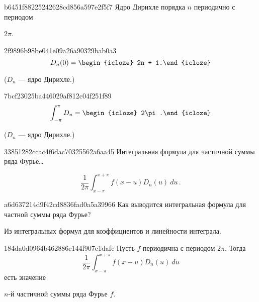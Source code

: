 \begin{note}{b6451f88225242628cd856a597e2f5f7}
    Ядро Дирихле порядка \({ n }\) периодично с периодом \begin{icloze}{1}\({ 2\pi }\).\end{icloze}
\end{note}

\begin{note}{2f9896b98be041e09a26a90329bab0a3}
    \[
        D_n(0) = \begin{icloze}{1}2n + 1.\end{icloze}
    \]

    \begin{center}
        \tiny
        (\({ D_n }\) --- ядро Дирихле.)
    \end{center}
\end{note}

\begin{note}{7bcf23025ba446029af812c04f251f89}
    \[
        \int_{-\pi}^{\pi} D_n = \begin{icloze}{1}2\pi.\end{icloze}
    \]

    \begin{center}
        \tiny
        (\({ D_n }\) --- ядро Дирихле.)
    \end{center}
\end{note}

\begin{note}{33851282ccac4f6dac70325562a6aa45}
    Интегральная формула для частичной суммы ряда Фурье\ldots

    \begin{cloze}{1}
        \[
            \frac{1}{2\pi} \int_{x-\pi}^{x+\pi} f(x-u) D_{n}(u)\: du\,.
        \]
    \end{cloze}
\end{note}

\begin{note}{a6d637214d9f42cd8836fad0a5a39966}
    Как выводится интегральная формула для частной суммы ряда Фурье?

    \begin{cloze}{1}
        Из интегральных формул для коэффициентов и линейности интеграла.
    \end{cloze}
\end{note}

\begin{note}{184da0d0964b462886c144f907c1dafc}
    Пусть \({ f }\) периодична с периодом \({ 2\pi }\).
    Тогда
    \[
        \frac{1}{2\pi} \int_{x - \pi}^{x + \pi} f(x - u) D_n(u)\: du
    \]
    есть значение \begin{icloze}{1}\({ n }\)-й частичной суммы ряда Фурье \({ f }\).\end{icloze}
\end{note}


